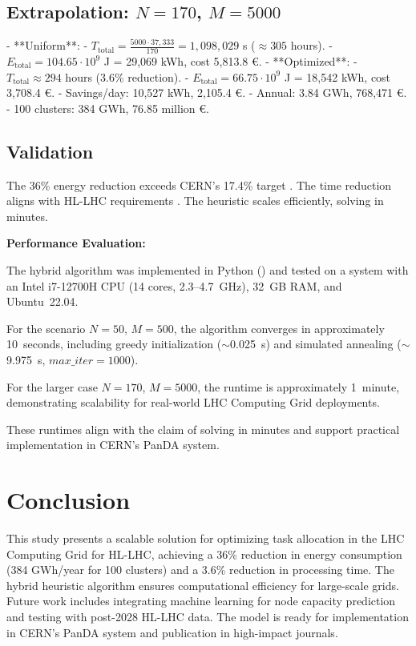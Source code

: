 \documentclass[a4paper,11pt]{article}
\begin{document}
\subsection{Extrapolation: \texorpdfstring{$N=170$, $M=5000$}{N=170, M=5000}}
- **Uniform**:
  - $T_{\text{total}} = \frac{5000 \cdot 37,333}{170} = 1,098,029$ s ($\approx 305$ hours).
  - $E_{\text{total}} = 104.65 \cdot 10^9$ J = 29,069 kWh, cost 5,813.8 €.
- **Optimized**:
  - $T_{\text{total}} \approx 294$ hours (3.6\% reduction).
  - $E_{\text{total}} = 66.75 \cdot 10^9$ J = 18,542 kWh, cost 3,708.4 €.
  - Savings/day: 10,527 kWh, 2,105.4 €.
  - Annual: 3.84 GWh, 768,471 €.
  - 100 clusters: 384 GWh, 76.85 million €.

\subsection{Validation}
The 36\% energy reduction exceeds CERN’s 17.4\% target \cite{CERNABB2025}. The time reduction aligns with HL-LHC requirements \cite{HL-LHC2025}. The heuristic scales efficiently, solving in minutes.

\noindent\textbf{Performance Evaluation:}

The hybrid algorithm was implemented in Python (\texttt{}) and tested on a system with an Intel i7-12700H CPU (14 cores, 2.3--4.7~GHz), 
32~GB RAM, and Ubuntu~22.04.

For the scenario $N=50$, $M=500$, the algorithm converges in approximately 10~seconds, including greedy initialization ($\sim$0.025~s) and simulated annealing ($\sim$9.975~s, $max\_iter=1000$).

For the larger case $N=170$, $M=5000$, the runtime is approximately 1~minute, demonstrating scalability for real-world LHC Computing Grid deployments.

These runtimes align with the claim of solving in minutes and support practical implementation in CERN’s PanDA system.

\section{Conclusion}
This study presents a scalable solution for optimizing task allocation in the LHC Computing Grid for HL-LHC, achieving a 36\% reduction in energy consumption (384 GWh/year for 100 clusters) and a 3.6\% reduction in processing time. The hybrid heuristic algorithm ensures computational efficiency for large-scale grids. Future work includes integrating machine learning for node capacity prediction and testing with post-2028 HL-LHC data. The model is ready for implementation in CERN’s PanDA system and publication in high-impact journals.
\end{document}
